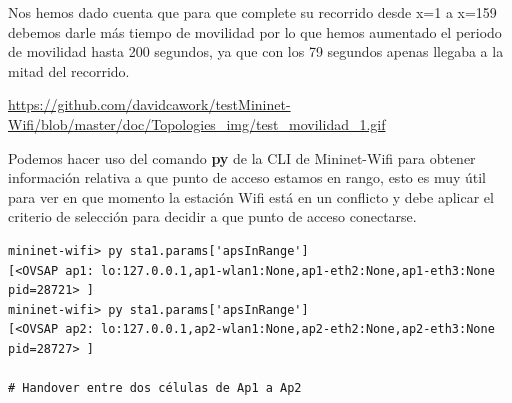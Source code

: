Nos hemos dado cuenta que para que complete su recorrido desde x=1 a x=159 debemos darle más tiempo de movilidad por lo que hemos aumentado el periodo de movilidad hasta 200 segundos, ya que con los 79 segundos apenas llegaba a la mitad del recorrido. \newline
\newline
\begin{center}
    \url{https://github.com/davidcawork/testMininet-Wifi/blob/master/doc/Topologies_img/test_movilidad_1.gif}
\end{center}

Podemos hacer uso del comando \textbf{py} de la CLI de Mininet-Wifi para obtener información relativa a que punto de acceso estamos en rango, esto es muy útil para ver en que momento la estación Wifi está en un conflicto y debe aplicar el criterio de selección para decidir a que punto de acceso conectarse.

\begin{verbatim}
mininet-wifi> py sta1.params['apsInRange']
[<OVSAP ap1: lo:127.0.0.1,ap1-wlan1:None,ap1-eth2:None,ap1-eth3:None pid=28721> ]
mininet-wifi> py sta1.params['apsInRange']
[<OVSAP ap2: lo:127.0.0.1,ap2-wlan1:None,ap2-eth2:None,ap2-eth3:None pid=28727> ]

# Handover entre dos células de Ap1 a Ap2 

\end{verbatim}

